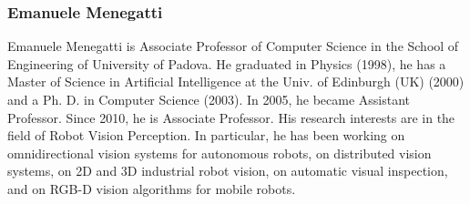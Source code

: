 \documentclass[conference]{IEEEtran}
\begin{document}
\subsubsection*{Emanuele Menegatti}
Emanuele Menegatti is Associate Professor of Computer Science in the School of Engineering of University of Padova. 
He graduated in Physics (1998), he has a Master of Science in Artificial Intelligence at the Univ. of Edinburgh (UK) (2000) and a Ph. D. in Computer Science (2003). 
In 2005, he became Assistant Professor. Since 2010, he is Associate Professor. 
His research interests are in the field of Robot Vision Perception. 
In particular, he has been working on omnidirectional vision systems for autonomous robots, on distributed vision systems, on 2D and 3D industrial robot vision, on automatic visual inspection, and on RGB-D vision algorithms for mobile robots.
\end{document}
